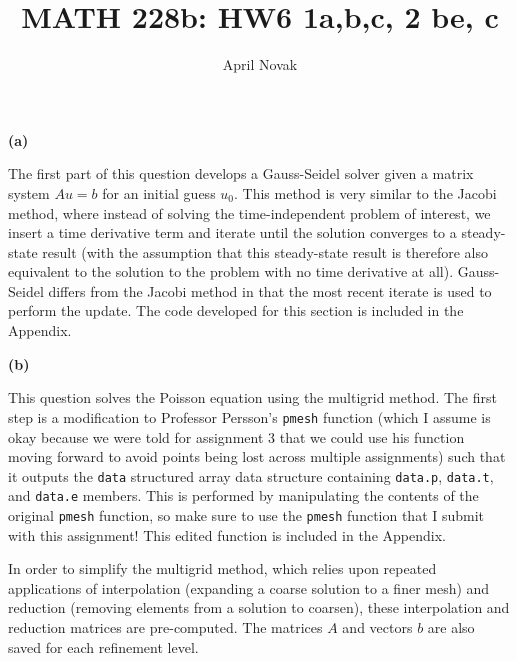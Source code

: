 \documentclass[10pt]{article}
\begin{document}
\title{MATH 228b: HW6 1a,b,c, 2 be, c}
\author{April Novak}

\maketitle

\section{}

\section{}

\textbf{(a)}

The first part of this question develops a Gauss-Seidel solver given a matrix system \(Au=b\) for an initial guess \(u_0\). This method is very similar to the Jacobi method, where instead of solving the time-independent problem of interest, we insert a time derivative term and iterate until the solution converges to a steady-state result (with the assumption that this steady-state result is therefore also equivalent to the solution to the problem with no time derivative at all). Gauss-Seidel differs from the Jacobi method in that the most recent iterate is used to perform the update. The code developed for this section is included in the Appendix.

\textbf{(b)}

This question solves the Poisson equation using the multigrid method. The first step is a modification to Professor Persson's {\tt pmesh} function (which I assume is okay because we were told for assignment 3 that we could use his function moving forward to avoid points being lost across multiple assignments) such that it outputs the {\tt data} structured array data structure containing {\tt data.p}, {\tt data.t}, and {\tt data.e} members. This is performed by manipulating the contents of the original {\tt pmesh} function, so make sure to use the {\tt pmesh} function that I submit with this assignment! This edited function is included in the Appendix.

In order to simplify the multigrid method, which relies upon repeated applications of interpolation (expanding a coarse solution to a finer mesh) and reduction (removing elements from a solution to coarsen), these interpolation and reduction matrices are pre-computed. The matrices \(A\) and vectors \(b\) are also saved for each refinement level. 
\end{document}
